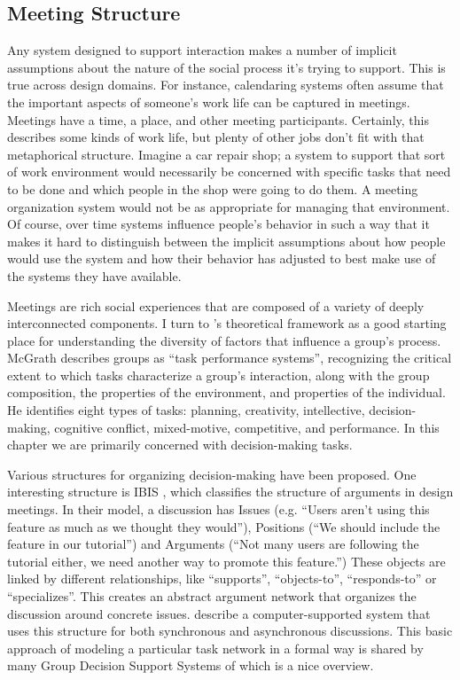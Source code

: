 \subsection{Meeting Structure}

Any system designed to support interaction makes a number of implicit assumptions about the nature of the social process it's trying to support. This is true across design domains. For instance, calendaring systems often assume that the important aspects of someone's work life can be captured in meetings. Meetings have a time, a place, and other meeting participants. Certainly, this describes some kinds of work life, but plenty of other jobs don't fit with that metaphorical structure. Imagine a car repair shop; a system to support that sort of work environment would necessarily be concerned with specific tasks that need to be done and which people in the shop were going to do them. A meeting organization system would not be as appropriate for managing that environment. Of course, over time systems influence people's behavior in such a way that it makes it hard to distinguish between the implicit assumptions about how people would use the system and how their behavior has adjusted to best make use of the systems they have available. 

Meetings are rich social experiences that are composed of a variety of deeply interconnected components. I turn to \citet{McGrath:1984un}'s theoretical framework as a good starting place for understanding the diversity of factors that influence a group's process. McGrath describes groups as ``task performance systems'', recognizing the critical extent to which tasks characterize a group's interaction, along with the group composition, the properties of the environment, and properties of the individual. He identifies eight types of tasks: planning, creativity, intellective, decision-making, cognitive conflict, mixed-motive, competitive, and performance. In this chapter we are primarily concerned with decision-making tasks.

Various structures for organizing decision-making have been proposed. One interesting structure is IBIS \citep{Kunz:1970wo}, which classifies the structure of arguments in design meetings. In their model, a discussion has Issues (e.g. ``Users aren't using this feature as much as we thought they would''), Positions (``We should include the feature in our tutorial'') and Arguments (``Not many users are following the tutorial either, we need another way to promote this feature.'') These objects are linked by different relationships, like ``supports'', ``objects-to'', ``responds-to'' or ``specializes''. This creates an abstract argument network that organizes the discussion around concrete issues. \citet{Conklin:1988fr} describe a computer-supported system that uses this structure for both synchronous and asynchronous discussions. This basic approach of modeling a particular task network in a formal way is shared by many Group Decision Support Systems of which \citet{nunamaker_electronic_1991} is a nice overview.

